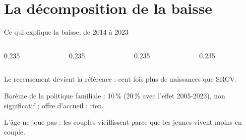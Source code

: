 \documentclass[10pt,aspectratio=169]{beamer}
\begin{document}
\section{La décomposition de la baisse}

\begin{frame}{Ce qui explique la baisse, de 2014 à 2023}
  \begin{columns}[T]
    \begin{column}{0.235\textwidth}\end{column}
    \begin{column}{0.235\textwidth}\end{column}
    \begin{column}{0.235\textwidth}\end{column}
    \begin{column}{0.235\textwidth}\end{column}
  \end{columns}
  \vspace{0.25cm}
  \begin{aere}
    \item Le recensement devient la référence : \alert{cent fois plus de naissances} que SRCV.
    \item Barème de la politique familiale : 10\,\% (20\,\% avec l'effet 2005-2023), non significatif ; offre d'accueil : rien.
    \item L'âge ne joue pas : les couples vieillissent parce que les jeunes vivent moins en couple.
  \end{aere}
\end{frame}
\end{document}
